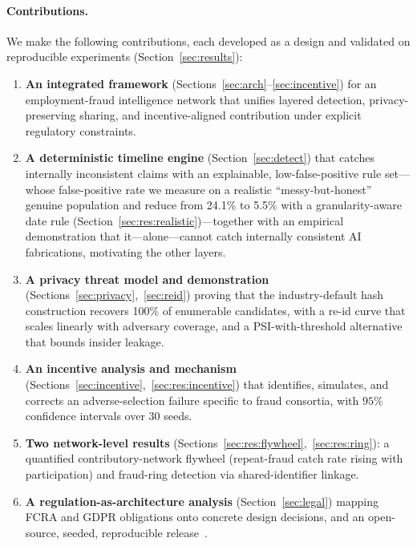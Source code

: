 \documentclass[11pt]{article}
\begin{document}
\paragraph{Contributions.}
We make the following contributions, each developed as a design and validated on
reproducible experiments (Section~\ref{sec:results}):
\begin{enumerate}[leftmargin=1.5em,itemsep=2pt]
  \item \textbf{An integrated framework} (Sections~\ref{sec:arch}--\ref{sec:incentive})
  for an employment-fraud intelligence network that unifies layered detection,
  privacy-preserving sharing, and incentive-aligned contribution under explicit
  regulatory constraints.
  \item \textbf{A deterministic timeline engine} (Section~\ref{sec:detect}) that
  catches internally inconsistent claims with an explainable, low-false-positive
  rule set---whose false-positive rate we measure on a realistic ``messy-but-honest''
  genuine population and reduce from 24.1\% to 5.5\% with a granularity-aware date
  rule (Section~\ref{sec:res:realistic})---together with an empirical demonstration
  that it---alone---cannot catch internally consistent AI fabrications, motivating
  the other layers.
  \item \textbf{A privacy threat model and demonstration}
  (Sections~\ref{sec:privacy},~\ref{sec:reid}) proving that the industry-default
  hash construction recovers 100\% of enumerable candidates, with a re-id curve
  that scales linearly with adversary coverage, and a PSI-with-threshold
  alternative that bounds insider leakage.
  \item \textbf{An incentive analysis and mechanism}
  (Sections~\ref{sec:incentive},~\ref{sec:res:incentive}) that identifies,
  simulates, and corrects an adverse-selection failure specific to fraud
  consortia, with $95\%$ confidence intervals over $30$ seeds.
  \item \textbf{Two network-level results}
  (Sections~\ref{sec:res:flywheel},~\ref{sec:res:ring}): a quantified
  contributory-network flywheel (repeat-fraud catch rate rising with
  participation) and fraud-ring detection via shared-identifier linkage.
  \item \textbf{A regulation-as-architecture analysis} (Section~\ref{sec:legal})
  mapping FCRA and GDPR obligations onto concrete design decisions, and an
  open-source, seeded, reproducible release~\cite{truthhirecode}.
\end{enumerate}
\end{document}
